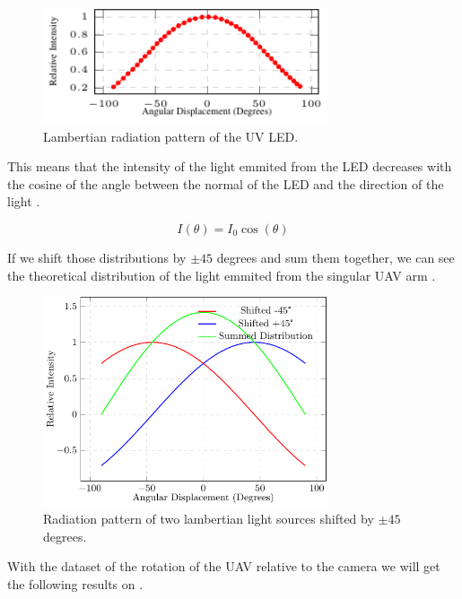 \begin {figure}[htbp]
	\centering
	\includegraphics[width=0.75\textwidth]{./fig/plots/lambertian/lambertian.pdf}
	\caption{Lambertian radiation pattern of the UV LED.}
	\label{fig:lambertian}
\end{figure}

This means that the intensity of the light emmited from the LED decreases with the cosine
of the angle between the normal of the LED and the direction of the light .

\begin{equation}
	I(\theta) = I_0\cos(\theta)
	\label{eq:lambertian}
\end{equation}

If we shift those distributions by $\pm 45$ degrees and sum them together, we can see the
theoretical distribution of the light emmited from the singular UAV arm .
\begin {figure}[htbp]
	\centering
	\includegraphics[width=0.75\textwidth]{./fig/plots/lambertian/3lambertian.pdf}
	\caption{Radiation pattern of two lambertian light sources shifted by $\pm 45$ degrees.}
	\label{fig:lambert_combined}
\end{figure}
With the dataset of the rotation of the UAV relative to the camera we will get the following results
on .

